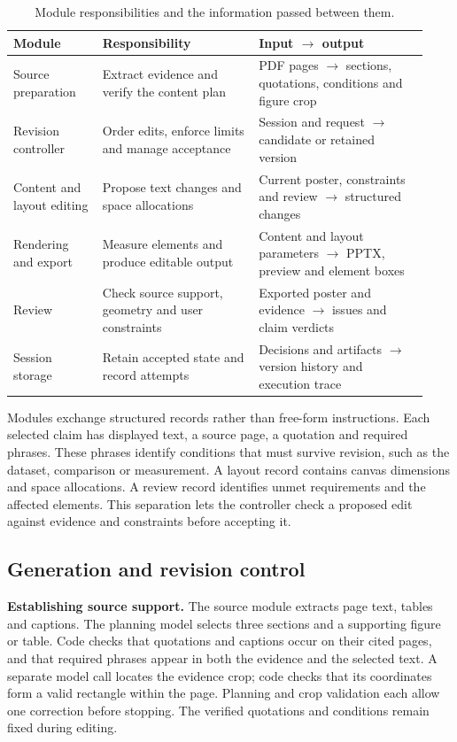 \documentclass{article}
\begin{document}
\begin{table}[ht]
\centering
\small
\caption{Module responsibilities and the information passed between them.}
\label{tab:pipeline}
\begin{tabular}{@{}p{0.20\linewidth}p{0.35\linewidth}p{0.38\linewidth}@{}}
\toprule
Module & Responsibility & Input $\rightarrow$ output \\
\midrule
Source preparation & Extract evidence and verify the content plan & PDF pages $\rightarrow$ sections, quotations, conditions and figure crop \\
Revision controller & Order edits, enforce limits and manage acceptance & Session and request $\rightarrow$ candidate or retained version \\
Content and layout editing & Propose text changes and space allocations & Current poster, constraints and review $\rightarrow$ structured changes \\
Rendering and export & Measure elements and produce editable output & Content and layout parameters $\rightarrow$ PPTX, preview and element boxes \\
Review & Check source support, geometry and user constraints & Exported poster and evidence $\rightarrow$ issues and claim verdicts \\
Session storage & Retain accepted state and record attempts & Decisions and artifacts $\rightarrow$ version history and execution trace \\
\bottomrule
\end{tabular}
\end{table}

Modules exchange structured records rather than free-form instructions. Each selected claim has displayed text, a source page, a quotation and required phrases. These phrases identify conditions that must survive revision, such as the dataset, comparison or measurement. A layout record contains canvas dimensions and space allocations. A review record identifies unmet requirements and the affected elements. This separation lets the controller check a proposed edit against evidence and constraints before accepting it.

\subsection{Generation and revision control}
\textbf{Establishing source support.} The source module extracts page text, tables and captions. The planning model selects three sections and a supporting figure or table. Code checks that quotations and captions occur on their cited pages, and that required phrases appear in both the evidence and the selected text. A separate model call locates the evidence crop; code checks that its coordinates form a valid rectangle within the page. Planning and crop validation each allow one correction before stopping. The verified quotations and conditions remain fixed during editing.
\end{document}
